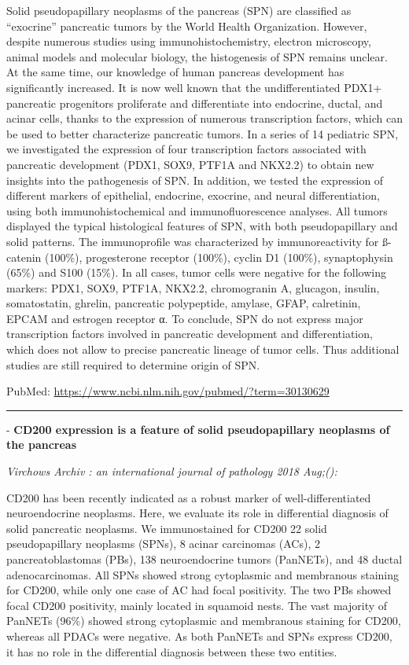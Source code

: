 \documentclass[]{article}
\begin{document}
Solid pseudopapillary neoplasms of the pancreas (SPN) are classified as
``exocrine'' pancreatic tumors by the World Health Organization.
However, despite numerous studies using immunohistochemistry, electron
microscopy, animal models and molecular biology, the histogenesis of SPN
remains unclear. At the same time, our knowledge of human pancreas
development has significantly increased. It is now well known that the
undifferentiated PDX1+ pancreatic progenitors proliferate and
differentiate into endocrine, ductal, and acinar cells, thanks to the
expression of numerous transcription factors, which can be used to
better characterize pancreatic tumors. In a series of 14 pediatric SPN,
we investigated the expression of four transcription factors associated
with pancreatic development (PDX1, SOX9, PTF1A and NKX2.2) to obtain new
insights into the pathogenesis of SPN. In addition, we tested the
expression of different markers of epithelial, endocrine, exocrine, and
neural differentiation, using both immunohistochemical and
immunofluorescence analyses. All tumors displayed the typical
histological features of SPN, with both pseudopapillary and solid
patterns. The immunoprofile was characterized by immunoreactivity for
ß-catenin (100\%), progesterone receptor (100\%), cyclin D1 (100\%),
synaptophysin (65\%) and S100 (15\%). In all cases, tumor cells were
negative for the following markers: PDX1, SOX9, PTF1A, NKX2.2,
chromogranin A, glucagon, insulin, somatostatin, ghrelin, pancreatic
polypeptide, amylase, GFAP, calretinin, EPCAM and estrogen receptor α.
To conclude, SPN do not express major transcription factors involved in
pancreatic development and differentiation, which does not allow to
precise pancreatic lineage of tumor cells. Thus additional studies are
still required to determine origin of SPN.

PubMed: \url{https://www.ncbi.nlm.nih.gov/pubmed/?term=30130629}

{}

{}

\begin{center}\rule{0.5\linewidth}{\linethickness}\end{center}

 - \textbf{CD200 expression is a feature of solid pseudopapillary
neoplasms of the pancreas}

\emph{Virchows Archiv : an international journal of pathology 2018
Aug;():}

CD200 has been recently indicated as a robust marker of
well-differentiated neuroendocrine neoplasms. Here, we evaluate its role
in differential diagnosis of solid pancreatic neoplasms. We
immunostained for CD200 22 solid pseudopapillary neoplasms (SPNs), 8
acinar carcinomas (ACs), 2 pancreatoblastomas (PBs), 138 neuroendocrine
tumors (PanNETs), and 48 ductal adenocarcinomas. All SPNs showed strong
cytoplasmic and membranous staining for CD200, while only one case of AC
had focal positivity. The two PBs showed focal CD200 positivity, mainly
located in squamoid nests. The vast majority of PanNETs (96\%) showed
strong cytoplasmic and membranous staining for CD200, whereas all PDACs
were negative. As both PanNETs and SPNs express CD200, it has no role in
the differential diagnosis between these two entities.
\end{document}
